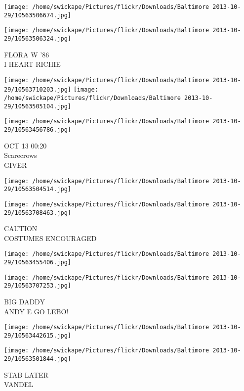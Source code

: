 \documentclass[10pt,letterpaper]{article}
\begin{document}
\texttt{[image: /home/swickape/Pictures/flickr/Downloads/Baltimore 2013-10-29/10563506674.jpg]}

\vspace{0.25in}
\texttt{[image: /home/swickape/Pictures/flickr/Downloads/Baltimore 2013-10-29/10563506324.jpg]}

FLORA W '86\\
I HEART RICHIE\\
\pagebreak

\texttt{[image: /home/swickape/Pictures/flickr/Downloads/Baltimore 2013-10-29/10563710203.jpg]}
\texttt{[image: /home/swickape/Pictures/flickr/Downloads/Baltimore 2013-10-29/10563505104.jpg]}

\texttt{[image: /home/swickape/Pictures/flickr/Downloads/Baltimore 2013-10-29/10563456786.jpg]}

OCT 13 00:20\\
Scarecrows\\
GIVER\\
\pagebreak

\texttt{[image: /home/swickape/Pictures/flickr/Downloads/Baltimore 2013-10-29/10563504514.jpg]}

\vspace{0.25in}
\texttt{[image: /home/swickape/Pictures/flickr/Downloads/Baltimore 2013-10-29/10563708463.jpg]}

CAUTION\\
COSTUMES ENCOURAGED\\
\pagebreak

\texttt{[image: /home/swickape/Pictures/flickr/Downloads/Baltimore 2013-10-29/10563455406.jpg]}

\vspace{0.25in}
\texttt{[image: /home/swickape/Pictures/flickr/Downloads/Baltimore 2013-10-29/10563707253.jpg]}

BIG DADDY\\
ANDY E GO LEBO!\\
\pagebreak

\texttt{[image: /home/swickape/Pictures/flickr/Downloads/Baltimore 2013-10-29/10563442615.jpg]}

\vspace{0.25in}
\texttt{[image: /home/swickape/Pictures/flickr/Downloads/Baltimore 2013-10-29/10563501844.jpg]}

STAB LATER\\
VANDEL\\
\pagebreak
\end{document}
